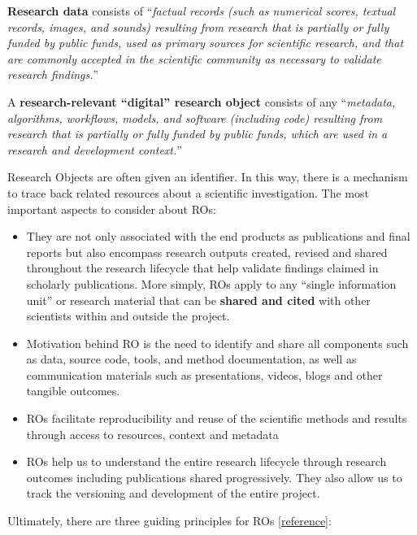 \documentclass[
  letterpaper,
  DIV=11,
  numbers=noendperiod]{scrreport}
\providecommand{\tightlist}{%
  \setlength{\itemsep}{0pt}\setlength{\parskip}{0pt}}\usepackage{longtable,booktabs,array}
\begin{document}
\textbf{Research data} consists of ``\emph{factual records (such as
numerical scores, textual records, images, and sounds) resulting from
research that is partially or fully funded by public funds, used as
primary sources for scientific research, and that are commonly accepted
in the scientific community as necessary to validate research
findings.}''

A \textbf{research-relevant ``digital'' research object} consists of any
``\emph{metadata, algorithms, workflows, models, and software (including
code) resulting from research that is partially or fully funded by
public funds, which are used in a research and development context.}''

Research Objects are often given an identifier. In this way, there is a
mechanism to trace back related resources about a scientific
investigation. The most important aspects to consider about ROs:

\begin{itemize}
\tightlist
\item
  They are not only associated with the end products as publications and
  final reports but also encompass research outputs created, revised and
  shared throughout the research lifecycle that help validate findings
  claimed in scholarly publications. More simply, ROs apply to any
  ``single information unit'' or research material that can be
  \textbf{shared and cited} with other scientists within and outside the
  project.
\item
  Motivation behind RO is the need to identify and share all components
  such as data, source code, tools, and method documentation, as well as
  communication materials such as presentations, videos, blogs and other
  tangible outcomes.
\item
  ROs facilitate reproducibility and reuse of the scientific methods and
  results through access to resources, context and metadata
\item
  ROs help us to understand the entire research lifecycle through
  research outcomes including publications shared progressively. They
  also allow us to track the versioning and development of the entire
  project.
\end{itemize}

Ultimately, there are three guiding principles for ROs
{[}\href{https://the-turing-way.netlify.app/communication/research-objects.html}{reference}{]}:
\end{document}
